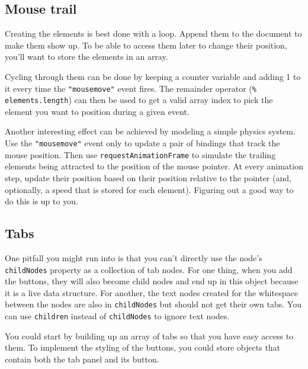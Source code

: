 \subsection{Mouse trail}

Creating the elements is best done with a loop. Append them to the document to make them show up. To be able to access them later to change their position, you'll want to store the elements in an array.

Cycling through them can be done by keeping a counter variable and adding 1 to it every time the \lstinline`"mousemove"` event fires. The remainder operator (\lstinline`% elements.length`) can then be used to get a valid array index to pick the element you want to position during a given event.

Another interesting effect can be achieved by modeling a simple physics system. Use the \lstinline`"mousemove"` event only to update a pair of bindings that track the mouse position. Then use \lstinline`requestAnimationFrame` to simulate the trailing elements being attracted to the position of the mouse pointer. At every animation step, update their position based on their position relative to the pointer (and, optionally, a speed that is stored for each element). Figuring out a good way to do this is up to you.

\subsection{Tabs}

One pitfall you might run into is that you can't directly use the node's \lstinline`childNodes` property as a collection of tab nodes. For one thing, when you add the buttons, they will also become child nodes and end up in this object because it is a live data structure. For another, the text nodes created for the whitespace between the nodes are also in \lstinline`childNodes` but should not get their own tabs. You can use \lstinline`children` instead of \lstinline`childNodes` to ignore text nodes.

You could start by building up an array of tabs so that you have easy access to them. To implement the styling of the buttons, you could store objects that contain both the tab panel and its button.

